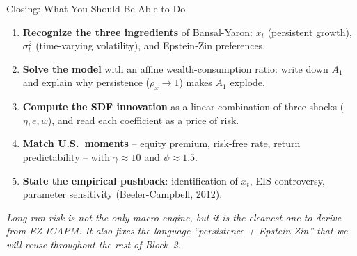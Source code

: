 \documentclass{beamer}
\begin{document}
\begin{frame}{Closing: What You Should Be Able to Do}
	\begin{enumerate}
		\item \textbf{Recognize the three ingredients} of Bansal-Yaron: $x_t$ (persistent growth), $\sigma_t^2$ (time-varying volatility), and Epstein-Zin preferences.
		\item \textbf{Solve the model} with an affine wealth-consumption ratio: write down $A_1$ and explain why persistence ($\rho_x \to 1$) makes $A_1$ explode.
		\item \textbf{Compute the SDF innovation} as a linear combination of three shocks ($\eta,e,w$), and read each coefficient as a price of risk.
		\item \textbf{Match U.S.\ moments} -- equity premium, risk-free rate, return predictability -- with $\gamma\approx 10$ and $\psi\approx 1.5$.
		\item \textbf{State the empirical pushback}: identification of $x_t$, EIS controversy, parameter sensitivity (Beeler-Campbell, 2012).
	\end{enumerate}
	\vspace{6pt}
	\begin{center}
		\small \textit{Long-run risk is not the only macro engine, but it is the cleanest one to derive from EZ-ICAPM. It also fixes the language ``persistence + Epstein-Zin'' that we will reuse throughout the rest of Block~2.}
	\end{center}
\end{frame}
\end{document}
